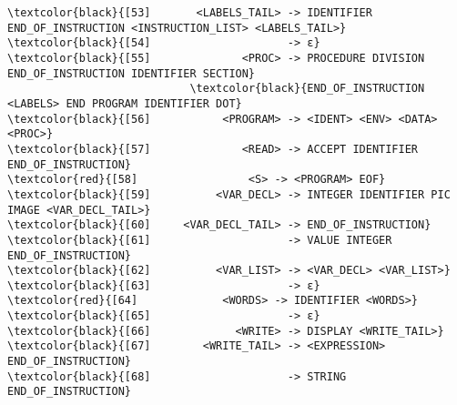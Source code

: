 \begin{Verbatim}[commandchars=\\\{\}]
\textcolor{black}{[53]       <LABELS_TAIL> -> IDENTIFIER END_OF_INSTRUCTION <INSTRUCTION_LIST> <LABELS_TAIL>}
\textcolor{black}{[54]                     -> ε}
\textcolor{black}{[55]              <PROC> -> PROCEDURE DIVISION END_OF_INSTRUCTION IDENTIFIER SECTION}
                            \textcolor{black}{END_OF_INSTRUCTION <LABELS> END PROGRAM IDENTIFIER DOT}
\textcolor{black}{[56]           <PROGRAM> -> <IDENT> <ENV> <DATA> <PROC>}
\textcolor{black}{[57]              <READ> -> ACCEPT IDENTIFIER END_OF_INSTRUCTION}
\textcolor{red}{[58]                 <S> -> <PROGRAM> EOF}
\textcolor{black}{[59]          <VAR_DECL> -> INTEGER IDENTIFIER PIC IMAGE <VAR_DECL_TAIL>}
\textcolor{black}{[60]     <VAR_DECL_TAIL> -> END_OF_INSTRUCTION}
\textcolor{black}{[61]                     -> VALUE INTEGER END_OF_INSTRUCTION}
\textcolor{black}{[62]          <VAR_LIST> -> <VAR_DECL> <VAR_LIST>}
\textcolor{black}{[63]                     -> ε}
\textcolor{red}{[64]             <WORDS> -> IDENTIFIER <WORDS>}
\textcolor{black}{[65]                     -> ε}
\textcolor{black}{[66]             <WRITE> -> DISPLAY <WRITE_TAIL>}
\textcolor{black}{[67]        <WRITE_TAIL> -> <EXPRESSION> END_OF_INSTRUCTION}
\textcolor{black}{[68]                     -> STRING END_OF_INSTRUCTION}
\end{Verbatim}
\endgroup